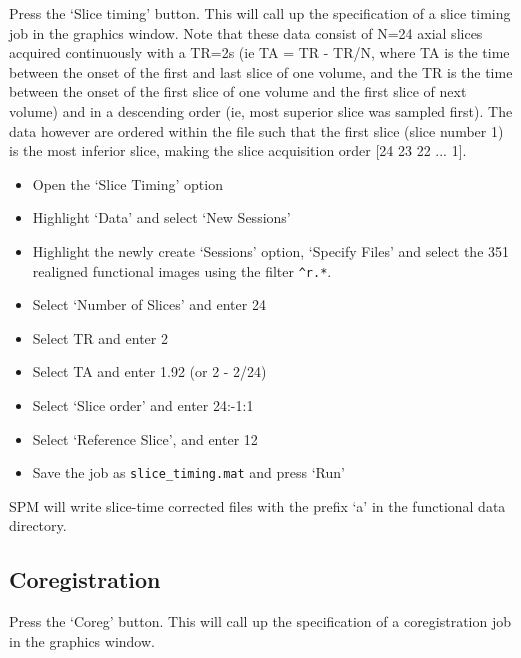 \documentclass[a4paper,titlepage]{book}
\newcommand{\bi}{\begin{itemize}}
\newcommand{\ei}{\end{itemize}}
\begin{document}
Press the `Slice timing' button. This will call up the specification of a slice timing job in the graphics window. Note that these data consist of N=24 axial slices acquired continuously with a TR=2s (ie TA = TR - TR/N, where TA is the time between the onset of the first and last slice of one volume, and the TR is the time between the onset of the first slice of one volume and the first slice of next volume) and in a descending order (ie, most superior slice was sampled first). The data however are ordered within the file such that the first slice (slice number 1) is the most inferior slice, making the slice acquisition order [24 23 22 ... 1].
\bi
\item{Open the `Slice Timing' option}
\item{Highlight `Data' and select `New Sessions'}
\item{Highlight the newly create `Sessions' option, `Specify Files' and select the
351 realigned functional images using the 
filter \verb!^r.*!.}
\item{Select `Number of Slices' and enter 24}
\item{Select TR and enter 2}
\item{Select TA and enter 1.92 (or 2 - 2/24)}
\item{Select `Slice order' and enter 24:-1:1}
\item{Select `Reference Slice', and enter 12}
\item{Save the job as \verb!slice_timing.mat! and press `Run'}
\ei
SPM will write slice-time corrected files with 
the prefix `a' in the functional data directory.

\subsection{Coregistration}

Press the `Coreg' button. This will call up the specification of a coregistration job in the graphics 
window. 
\end{document}
